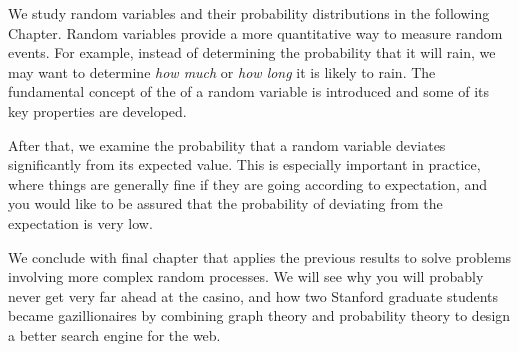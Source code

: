 We study random variables and their probability distributions in the
following Chapter. %
Random variables provide a more quantitative way to measure random
events.  For example, instead of determining the probability that it
will rain, we may want to determine \emph{how much} or \emph{how long}
it is likely to rain.  The fundamental concept of the  of a random variable is introduced and some of its key
properties are developed.

After that, %
we examine the probability that a random variable deviates
significantly from its expected value.  This is especially important
in practice, where things are generally fine if they are going
according to expectation, and you would like to be assured that the
probability of deviating from the expectation is very low.

We conclude with final chapter that applies the previous results
to solve problems involving more complex random processes.  We will
see why you will probably never get very far ahead at the casino, and
how two Stanford graduate students became gazillionaires by combining
graph theory and probability theory to design a better search engine
for the web.

\endinput
